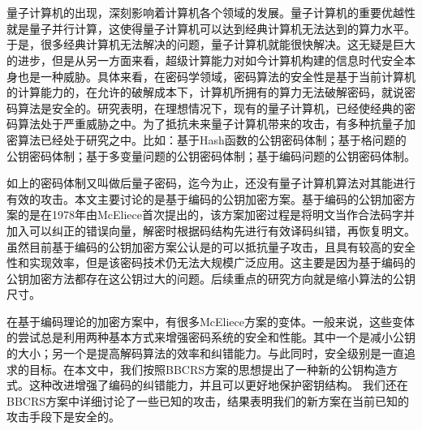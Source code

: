 \vspace{-2.5cm}
\chapter*{}
\vspace{-1cm}
量子计算机的出现，深刻影响着计算机各个领域的发展。量子计算机的重要优越性就是量子并行计算，这使得量子计算机可以达到经典计算机无法达到的算力水平。于是，很多经典计算机无法解决的问题，量子计算机就能很快解决。这无疑是巨大的进步，但是从另一方面来看，超级计算能力对如今计算机构建的信息时代安全本身也是一种威胁。具体来看，在密码学领域，密码算法的安全性是基于当前计算机的计算能力的，在允许的破解成本下，计算机所拥有的算力无法破解密码，就说密码算法是安全的。研究表明，在理想情况下，现有的量子计算机，已经使经典的密码算法处于严重威胁之中。为了抵抗未来量子计算机带来的攻击，有多种抗量子加密算法已经处于研究之中。比如：基于Hash函数的公钥密码体制；基于格问题的公钥密码体制；基于多变量问题的公钥密码体制；基于编码问题的公钥密码体制。

如上的密码体制又叫做后量子密码，迄今为止，还没有量子计算机算法对其能进行有效的攻击。本文主要讨论的是基于编码的公钥加密方案。基于编码的公钥加密方案的是在1978年由McEliece首次提出的，该方案加密过程是将明文当作合法码字并加入可以纠正的错误向量，解密时根据码结构先进行有效译码纠错，再恢复明文。虽然目前基于编码的公钥加密方案公认是的可以抵抗量子攻击，且具有较高的安全性和实现效率，但是该密码技术仍无法大规模广泛应用。这主要是因为基于编码的公钥加密方法都存在这公钥过大的问题。后续重点的研究方向就是缩小算法的公钥尺寸。

在基于编码理论的加密方案中，有很多McEliece方案的变体。一般来说，这些变体的尝试总是利用两种基本方式来增强密码系统的安全和性能。其中一个是减小公钥的大小；另一个是提高解码算法的效率和纠错能力。与此同时，安全级别是一直追求的目标。在本文中，我们按照BBCRS方案的思想提出了一种新的公钥构造方式。这种改进增强了编码的纠错能力，并且可以更好地保护密钥结构。 我们还在BBCRS方案中详细讨论了一些已知的攻击，结果表明我们的新方案在当前已知的攻击手段下是安全的。


\hspace{-0.5cm}
 
